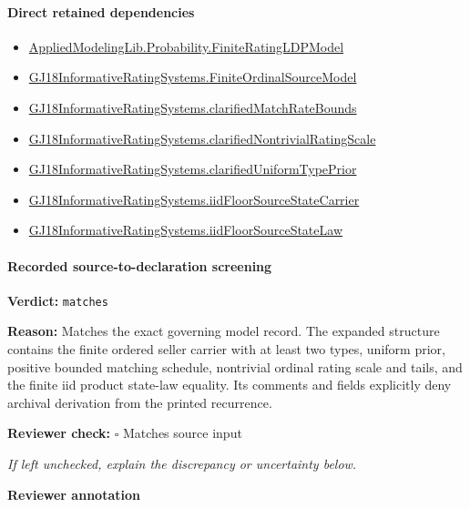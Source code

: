\documentclass[10pt]{article}
\newcommand{\reviewerbox}{%
  \par\noindent\fbox{\parbox{0.96\linewidth}{\rule{0pt}{0.38in}}}\par
}
\newcommand{\reviewmatch}[1]{%
  \par\noindent\textbf{Reviewer check:} $\square$\; #1\par
  \noindent\emph{If left unchecked, explain the discrepancy or uncertainty below.}\par
}
\begin{document}
\paragraph{Direct retained dependencies}
\begin{itemize}\raggedright
\item \hyperlink{governing-declaration-765e92a42a7a9947}{Applied\allowbreak{}Modeling\allowbreak{}Lib.\allowbreak{}Probability.\allowbreak{}Finite\allowbreak{}Rating\allowbreak{}LDP\allowbreak{}Model}
\item \hyperlink{governing-declaration-9d70577d8e1f92b4}{GJ18\allowbreak{}Informative\allowbreak{}Rating\allowbreak{}Systems.\allowbreak{}Finite\allowbreak{}Ordinal\allowbreak{}Source\allowbreak{}Model}
\item \hyperlink{governing-declaration-598e4fbddf4f756c}{GJ18\allowbreak{}Informative\allowbreak{}Rating\allowbreak{}Systems.\allowbreak{}clarified\allowbreak{}Match\allowbreak{}Rate\allowbreak{}Bounds}
\item \hyperlink{governing-declaration-79773a66aa4fec98}{GJ18\allowbreak{}Informative\allowbreak{}Rating\allowbreak{}Systems.\allowbreak{}clarified\allowbreak{}Nontrivial\allowbreak{}Rating\allowbreak{}Scale}
\item \hyperlink{governing-declaration-8cf02c8eac0c51c7}{GJ18\allowbreak{}Informative\allowbreak{}Rating\allowbreak{}Systems.\allowbreak{}clarified\allowbreak{}Uniform\allowbreak{}Type\allowbreak{}Prior}
\item \hyperlink{governing-declaration-70ff3320c885dbc0}{GJ18\allowbreak{}Informative\allowbreak{}Rating\allowbreak{}Systems.\allowbreak{}iid\allowbreak{}Floor\allowbreak{}Source\allowbreak{}State\allowbreak{}Carrier}
\item \hyperlink{governing-declaration-d95c2e3ca64a056a}{GJ18\allowbreak{}Informative\allowbreak{}Rating\allowbreak{}Systems.\allowbreak{}iid\allowbreak{}Floor\allowbreak{}Source\allowbreak{}State\allowbreak{}Law}
\end{itemize}
\paragraph{Recorded source-to-declaration screening}
\textbf{Verdict:} \texttt{matches}
\\
{\raggedright
\textbf{Reason:} Matches the exact governing model record.\allowbreak{} The expanded structure contains the finite ordered seller carrier with at least two types, uniform prior, positive bounded matching schedule, nontrivial ordinal rating scale and tails, and the finite iid product state-\allowbreak{}law equality.\allowbreak{} Its comments and fields explicitly deny archival derivation from the printed recurrence.\allowbreak{}
\par}
\reviewmatch{Matches source input}
\noindent\textbf{Reviewer annotation}\par
\reviewerbox
\clearpage
\hypertarget{paper-prerequisite-e2953365ffe4a1ff}{}
\end{document}
